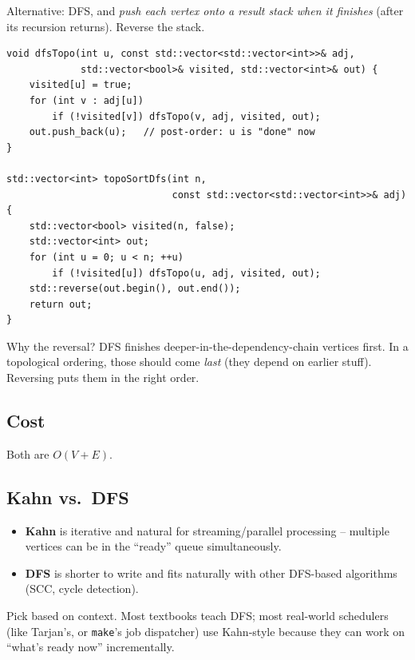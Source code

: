 \documentclass[11pt]{article}
\begin{document}
Alternative: DFS, and \emph{push each vertex onto a result stack when it finishes} (after its recursion returns). Reverse the stack.

\begin{lstlisting}[basicstyle=\ttfamily\small,frame=single]
void dfsTopo(int u, const std::vector<std::vector<int>>& adj,
             std::vector<bool>& visited, std::vector<int>& out) {
    visited[u] = true;
    for (int v : adj[u])
        if (!visited[v]) dfsTopo(v, adj, visited, out);
    out.push_back(u);   // post-order: u is "done" now
}

std::vector<int> topoSortDfs(int n,
                             const std::vector<std::vector<int>>& adj) {
    std::vector<bool> visited(n, false);
    std::vector<int> out;
    for (int u = 0; u < n; ++u)
        if (!visited[u]) dfsTopo(u, adj, visited, out);
    std::reverse(out.begin(), out.end());
    return out;
}
\end{lstlisting}

Why the reversal? DFS finishes deeper-in-the-dependency-chain vertices first. In a topological ordering, those should come \emph{last} (they depend on earlier stuff). Reversing puts them in the right order.

\subsection*{Cost}

Both are $O(V + E)$.

\subsection*{Kahn vs.\ DFS}

\begin{itemize}[leftmargin=*]
    \item \textbf{Kahn} is iterative and natural for streaming/parallel processing -- multiple vertices can be in the ``ready'' queue simultaneously.
    \item \textbf{DFS} is shorter to write and fits naturally with other DFS-based algorithms (SCC, cycle detection).
\end{itemize}

Pick based on context. Most textbooks teach DFS; most real-world schedulers (like Tarjan's, or \texttt{make}'s job dispatcher) use Kahn-style because they can work on ``what's ready now'' incrementally.
\end{document}
